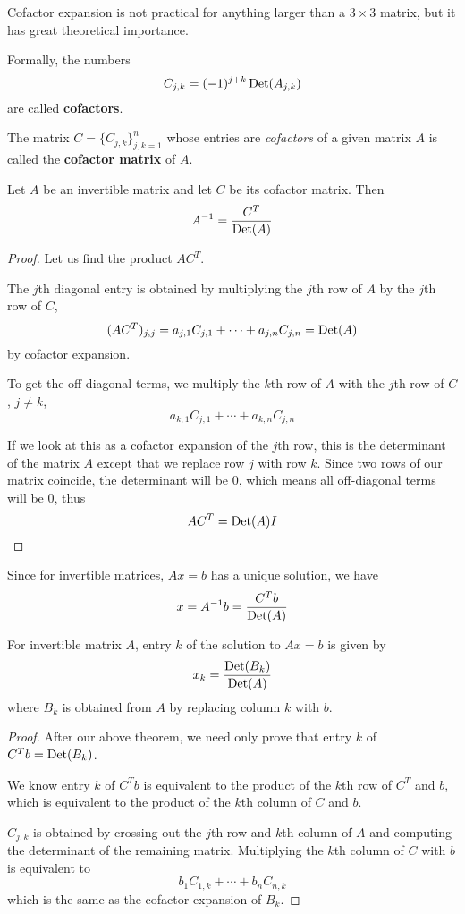 Cofactor expansion is not practical for anything larger than a $3 \times 3$ matrix, but it has great theoretical importance. 

\begin{definition}
Formally, the numbers 
$$C_{j, k}= (-1)^{j + k} \operatorname{Det}(A_{j,k})$$
are called \textbf{cofactors}.

The matrix $C = \{ C_{j, k}\}^{n}_{j, k = 1}$ whose entries are \textit{cofactors} of a given matrix $A$ is called the \textbf{cofactor matrix} of $A$. 
\end{definition}

\begin{theorem}
Let $A$ be an invertible matrix and let $C$ be its cofactor matrix. Then 
$$A^{-1} = \frac{C^{T}}{\operatorname{Det}(A)}$$
\end{theorem}

\begin{proof}
Let us find the product $AC^{T}$. 

The $j$th diagonal entry is obtained by multiplying the $j$th row of $A$ by the $j$th row of $C$,
$$(AC^{T})_{j, j} = a_{j, 1} C_{j, 1} + \cdots + a_{j, n} C_{j, n} = \operatorname{Det}(A)$$
by cofactor expansion. 

To get the off-diagonal terms, we multiply the $k$th row of $A$ with the $j$th row of $C$, $j \neq k$, 
$$a_{k, 1} C_{j, 1} + \cdots + a_{k, n} C_{j, n}$$

If we look at this as a cofactor expansion of the $j$th row, this is the determinant of the matrix $A$ except that we replace row $j$ with row $k$. Since two rows of our matrix coincide, the determinant will be 0, which means all off-diagonal terms will be 0, thus 
$$AC^{T} = \operatorname{Det}(A) I$$
\end{proof}

Since for invertible matrices, $Ax = b$ has a unique solution, we have 
$$x = A^{-1} b = \frac{C^{T}b}{\operatorname{Det}(A)}$$

\begin{theorem}
For invertible matrix $A$, entry $k$ of the solution to $Ax = b$ is given by 
$$x_{k} = \frac{\operatorname{Det}(B_{k})}{\operatorname{Det}(A)} $$
where $B_{k}$ is obtained from $A$ by replacing column $k$ with $b$. 
\end{theorem}

\begin{proof}
After our above theorem, we need only prove that entry $k$ of $C^{T}b = \operatorname{Det}(B_{k})$. 

We know entry $k$ of $C^{T} b$ is equivalent to the product of the $k$th row of $C^{T}$ and $b$, which is equivalent to the product of the $k$th column of $C$ and $b$. 

$C_{j,k}$ is obtained by crossing out the $j$th row and $k$th column of $A$ and computing the determinant of the remaining matrix. Multiplying the $k$th column of $C$ with $b$ is equivalent to 
$$b_{1} C_{1, k} + \cdots + b_{n} C_{n, k}$$ 
which is the same as the cofactor expansion of $B_{k}$. 
\end{proof}

